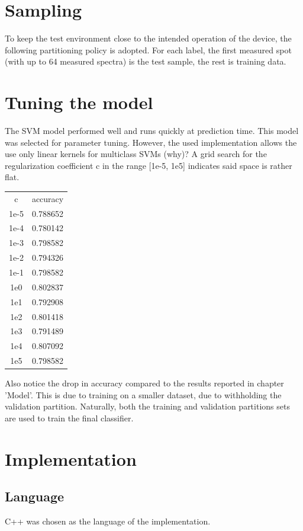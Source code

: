 \documentclass{article}
\begin{document}
\section{Sampling}
To keep the test environment close to the intended operation of the device, the following partitioning policy is adopted.
For each label, the first measured spot (with up to 64 measured spectra) is the test sample, the rest is training data.


\section{Tuning the model}
The SVM model performed well and runs quickly at prediction time.
This model was selected for parameter tuning.
However, the used implementation allows the use only linear kernels for multiclass SVMs (why)?
A grid search for the regularization coefficient c in the range [1e-5, 1e5] indicates said space is rather flat.

\begin{tabular}{ c | c }
c & accuracy  \\
1e-5 & 0.788652  \\
1e-4 & 0.780142  \\
1e-3 & 0.798582  \\
1e-2 & 0.794326  \\
1e-1 & 0.798582  \\
1e0 & 0.802837  \\
1e1 & 0.792908  \\
1e2 & 0.801418  \\
1e3 & 0.791489  \\
1e4 & 0.807092  \\
1e5 & 0.798582  \\
\end{tabular}

Also notice the drop in accuracy compared to the results reported in chapter 'Model'.
This is due to training on a smaller dataset, due to withholding the validation partition.
Naturally, both the training and validation partitions sets are used to train the final classifier.


\section{Implementation}
\subsection{Language}
C++ was chosen as the language of the implementation.
\end{document}
